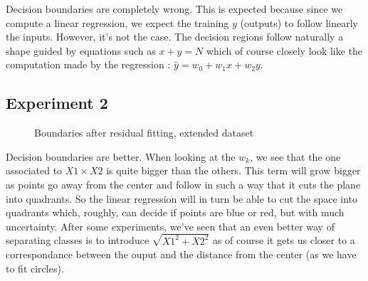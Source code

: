 \documentclass{article}
\begin{document}
Decision boundaries are completely wrong.
This is expected because since we compute a linear regression, we expect
the training $y$ (outputs) to follow linearly the inputs. However, it's not the case. The decision  regions follow naturally a shape guided by equations such as $x + y = N$ which of course closely look like the computation made by the regression :  $\hat{y} = w_0 + w_1 x + w_2 y$.

\subsection{Experiment 2}
	\begin{figure}[H]
	\centering
	
	\caption{\label{resfit1}Boundaries after residual fitting, extended dataset}
     \end{figure}

Decision boundaries are better.
When looking at the $w_k$, we see that the one associated to $X1 \times X2$ is quite bigger than the others. This term will grow bigger as points go away from the center and follow in such a way that it cuts the plane into quadrants. So the linear regression will in turn be able to cut the space into quadrants which, roughly, can decide if points are blue or red, but with much uncertainty. After some experiments, we've seen that an even better way of separating classes is to introduce $\sqrt{X1 ^ 2 + X2 ^ 2}$ as of course it gets us closer to a correspondance between the ouput and the distance from the center (as we have to fit circles).

\end{document}
